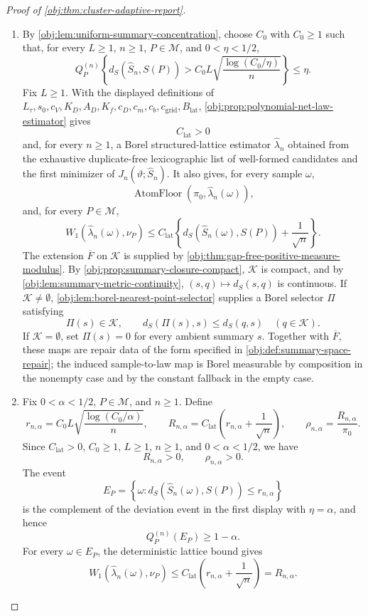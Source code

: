 \begin{proof}[Proof of \cref{obj:thm:cluster-adaptive-report}]
\begin{enumerate}
\item By \cref{obj:lem:uniform-summary-concentration}, choose \(C_0\) with
\(C_0\ge1\) such that, for every \(L\ge1\), \(n\ge1\), \(P\in\mathcal M\),
and \(0<\eta<1/2\),
\[
Q_P^{(n)}
\left\{
d_S(\widehat S_n,S(P))
>
C_0L\sqrt{\frac{\log(C_0/\eta)}{n}}
\right\}
\le \eta .
\]
Fix \(L\ge1\).  With the displayed definitions of
\(L_\tau,s_0,c_V,K_D,A_D,K_f,c_D,c_m,c_b,c_{\mathrm{grid}},B_{\mathrm{lat}}\),
\cref{obj:prop:polynomial-net-law-estimator} gives
\[
C_{\mathrm{lat}}>0
\]
and, for every \(n\ge1\), a Borel structured-lattice estimator
\(\widehat\lambda_n\) obtained from the exhaustive duplicate-free lexicographic
list of well-formed candidates and the first minimizer of
\(J_n(\vartheta;\widehat S_n)\).  It also gives, for every sample \(\omega\),
\[
\operatorname{AtomFloor}(\pi_0,\widehat\lambda_n(\omega)),
\]
and, for every \(P\in\mathcal M\),
\[
W_1(\widehat\lambda_n(\omega),\nu_P)
\le
C_{\mathrm{lat}}
\left\{
d_S(\widehat S_n(\omega),S(P))+\frac1{\sqrt n}
\right\}.
\]
The extension \(\overline F\) on \(\mathcal K\) is supplied by
\cref{obj:thm:gap-free-positive-measure-modulus}.  By
\cref{obj:prop:summary-closure-compact}, \(\mathcal K\) is compact, and by
\cref{obj:lem:summary-metric-continuity}, \((s,q)\mapsto d_S(s,q)\) is
continuous.  If \(\mathcal K\ne\emptyset\), \cref{obj:lem:borel-nearest-point-selector}
supplies a Borel selector \(\Pi\) satisfying
\[
\Pi(s)\in\mathcal K,
\qquad
d_S(\Pi(s),s)\le d_S(q,s)\quad(q\in\mathcal K).
\]
If \(\mathcal K=\emptyset\), set \(\Pi(s)=0\) for every ambient summary \(s\).
Together with \(\overline F\), these maps are repair data of the form specified
in \cref{obj:def:summary-space-repair}; the induced sample-to-law map is Borel
measurable by composition in the nonempty case and by the constant fallback in
the empty case. %

\item Fix \(0<\alpha<1/2\), \(P\in\mathcal M\), and \(n\ge1\).  Define
\[
r_{n,\alpha}
=
C_0L\sqrt{\frac{\log(C_0/\alpha)}{n}},
\qquad
R_{n,\alpha}
=
C_{\mathrm{lat}}\left(r_{n,\alpha}+\frac1{\sqrt n}\right),
\qquad
\rho_{n,\alpha}=\frac{R_{n,\alpha}}{\pi_0}.
\]
Since \(C_{\mathrm{lat}}>0\), \(C_0\ge1\), \(L\ge1\), \(n\ge1\), and
\(0<\alpha<1/2\), we have
\[
R_{n,\alpha}>0,
\qquad
\rho_{n,\alpha}>0.
\]
The event
\[
E_P=\left\{\omega:d_S(\widehat S_n(\omega),S(P))\le r_{n,\alpha}\right\}
\]
is the complement of the deviation event in the first display with
\(\eta=\alpha\), and hence
\[
Q_P^{(n)}(E_P)\ge1-\alpha .
\]
For every \(\omega\in E_P\), the deterministic lattice bound gives
\[
W_1(\widehat\lambda_n(\omega),\nu_P)
\le
C_{\mathrm{lat}}
\left(r_{n,\alpha}+\frac1{\sqrt n}\right)
=
R_{n,\alpha}. %
\]


\end{enumerate}
\end{proof}
